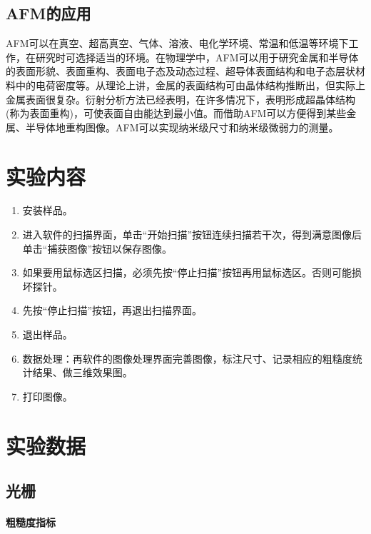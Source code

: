 \documentclass[a4paper]{article}
\begin{document}
\subsection{AFM的应用}
AFM可以在真空、超高真空、气体、溶液、电化学环境、常温和低温等环境下工作，在研究时可选择适当的环境。在物理学中，AFM可以用于研究金属和半导体的表面形貌、表面重构、表面电子态及动态过程、超导体表面结构和电子态层状材料中的电荷密度等。从理论上讲，金属的表面结构可由晶体结构推断出，但实际上金属表面很复杂。衍射分析方法已经表明，在许多情况下，表明形成超晶体结构(称为表面重构)，可使表面自由能达到最小值。而借助AFM可以方便得到某些金属、半导体地重构图像。AFM可以实现纳米级尺寸和纳米级微弱力的测量。

\section{实验内容}
\begin{enumerate}
\item 安装样品。
\item 进入软件的扫描界面，单击“开始扫描”按钮连续扫描若干次，得到满意图像后单击“捕获图像”按钮以保存图像。
\item 如果要用鼠标选区扫描，必须先按“停止扫描”按钮再用鼠标选区。否则可能损坏探针。
\item 先按“停止扫描”按钮，再退出扫描界面。
\item 退出样品。
\item 数据处理：再软件的图像处理界面完善图像，标注尺寸、记录相应的粗糙度统计结果、做三维效果图。
\item 打印图像。
\end{enumerate}

\section{实验数据}
\subsection{光栅}
\paragraph{粗糙度指标}~\\
\end{document}
